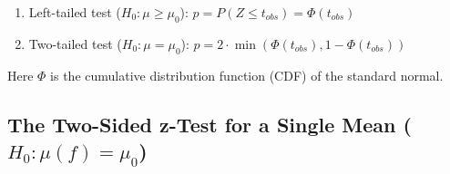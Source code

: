 \begin{enumerate}
\begin{enumerate}
\begin{enumerate}
            \item Left-tailed test ($H_0:\mu\geq\mu_0$): $p=P(Z\leq t_{obs})=\Phi(t_{obs})$
            \hfill \cite{common/online/chatgpt}

            \item Two-tailed test ($H_0:\mu= \mu_0$): $p = 2 \cdot \min(\Phi(t_{obs}), 1 - \Phi(t_{obs}))$
            \hfill \cite{common/online/chatgpt}
        \end{enumerate}
        Here $\Phi$ is the cumulative distribution function (CDF) of the standard normal.
        \hfill \cite{common/online/chatgpt}
    \end{enumerate}

\end{enumerate}




\subsection{The Two-Sided z-Test for a Single Mean ($H_0:\mu(f)=\mu_0$)}

